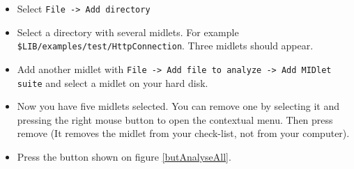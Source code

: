 \begin{itemize}
  \item Select \texttt{File -> Add directory}
  \item Select a directory with several midlets. For example
  \texttt{\${LIB}/examples/test/HttpConnection}. Three midlets should appear.
  \item Add another midlet with \texttt{File -> Add file to analyze -> Add
  MIDlet suite} and select a midlet on your hard disk.
  \item Now you have five midlets selected. You can remove one by selecting it
  and pressing the right mouse button to open the contextual menu. Then press
  remove (It removes the midlet from your check-list, not from your computer).
  \item Press the button shown on figure \ref{butAnalyseAll}.
\end{itemize}

